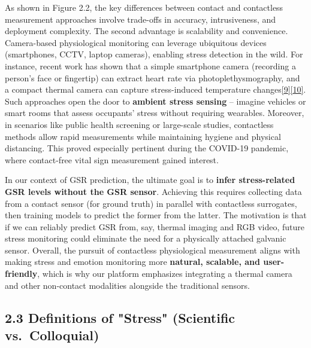 \documentclass[12pt,a4paper]{article}
\begin{document}
As shown in Figure 2.2, the key differences between contact and contactless measurement approaches involve trade-offs in accuracy, intrusiveness, and deployment complexity. The second advantage is scalability and convenience. Camera-based physiological monitoring can leverage ubiquitous devices (smartphones, CCTV, laptop cameras), enabling stress detection in the wild. For instance, recent work has shown that a simple smartphone camera (recording a person's face or fingertip) can extract heart rate via photoplethysmography, and a compact thermal camera can capture stress-induced temperature changes\href{https://pubmed.ncbi.nlm.nih.gov/30964440/\#:~:text=,cheap\%2C\%20convenient\%2C\%20and\%20mobile}{{[}9{]}}\href{https://ngdc.cncb.ac.cn/openlb/publication/OLB-PM-30964440\#:~:text=camera\%20can\%20be\%20used\%20to,convenient\%2C\%20and\%20mobile\%20monitoring\%20systems}{{[}10{]}}. Such approaches open the door to \textbf{ambient stress sensing} -- imagine vehicles or smart rooms that assess occupants' stress without requiring wearables. Moreover, in scenarios like public health screening or large-scale studies, contactless methods allow rapid measurements while maintaining hygiene and physical distancing. This proved especially pertinent during the COVID-19 pandemic, where contact-free vital sign measurement gained interest.

In our context of GSR prediction, the ultimate goal is to \textbf{infer stress-related GSR levels without the GSR sensor}. Achieving this requires collecting data from a contact sensor (for ground truth) in parallel with contactless surrogates, then training models to predict the former from the latter. The motivation is that if we can reliably predict GSR from, say, thermal imaging and RGB video, future stress monitoring could eliminate the need for a physically attached galvanic sensor. Overall, the pursuit of contactless physiological measurement aligns with making stress and emotion monitoring more \textbf{natural, scalable, and user-friendly}, which is why our platform emphasizes integrating a thermal camera and other non-contact modalities alongside the traditional sensors.

\subsection{2.3 Definitions of "Stress" (Scientific vs.~Colloquial)}\label{definitions-of-stress-scientific-vs.-colloquial}
\end{document}
